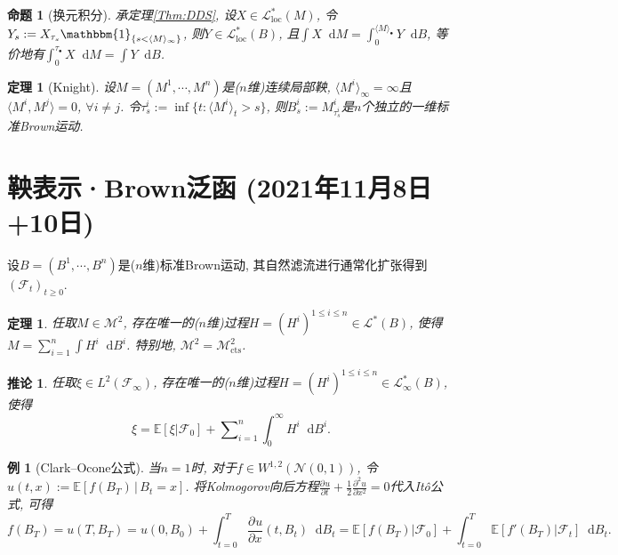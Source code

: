\documentclass{ctexart}
\theoremstyle{definition}
\theoremstyle{remark}
\theoremstyle{plain}
\newtheorem{Prop}[Def]{命题}
\newtheorem{Thm}[Def]{定理}
\newtheorem{Cor}[Def]{推论}
\newtheorem{Eg}[Def]{例}
\newtheorem{Ex}{习题}[section]
\newcommand{\N}{\mathcal{N}}				%
\newcommand{\1}{\mathbbm{1}}				%
\newcommand{\E}{\mathbb{E}}					%
\newcommand{\agp}[1]{\langle #1 \rangle}	%
\newcommand{\tsum}{\textstyle\sum\nolimits}
\renewcommand*{\d}{\mathop{}\!\mathrm{d}}	%
\newcommand{\pd}{\partial}					%
\newcommand{\p}[3][]{\frac{\pd^{#1}#2}{\pd{#3}^{#1}}}%
\begin{document}


\begin{Prop}[换元积分]
承定理\ref{Thm:DDS}, 设$X \in \mathcal{L}_{\mathrm{loc}}^{*}(M)$, 令$Y_{s} := X_{\tau_{s}}\1_{\{s<\agp{M}_{\infty}\}}$, 则$Y \in \mathcal{L}_{\mathrm{loc}}^{*}(B)$, 且$\int X \d M = \int_{0}^{\agp{M}_{\bullet}} Y \d B$, 等价地有$\int_{0}^{\tau_{\bullet}} X \d M = \int Y \d B$.
\end{Prop}

\begin{Thm}[Knight]
设$M = (M^{1},\cdots,M^{n})$是($n$维)连续局部鞅, $\agp{M^{i}}_{\infty} = \infty$且$\agp{M^{i},M^{j}} = 0$, $\forall i \neq j$. 令$\tau_{s}^{i} := \inf\{ t : \agp{M^{i}}_{t} > s \}$, 则$B^{i}_{s} := M^{i}_{\tau_{s}^{i}}$是$n$个独立的一维标准Brown运动.
\end{Thm}



\section{鞅表示·Brown泛函 \normalfont\footnotesize (2021年11月8日+10日)}
设$B = (B^{1},\cdots,B^{n})$是($n$维)标准Brown运动, 其自然滤流进行通常化扩张得到$(\mathscr{F}_{t})_{t \ge 0}$.

\begin{Thm}
任取$M \in \mathcal{M}^{2}$, 存在唯一的($n$维)过程$H = (H^{i})^{1\le i\le n} \in \mathcal{L}^{*}(B)$, 使得$M = \sum_{i=1}^{n} \int H^{i} \d B^{i}$. 特别地, $\mathcal{M}^{2} = \mathcal{M}^{2}_{\mathrm{cts}}$.
\end{Thm}

\begin{Cor}
任取$\xi \in L^{2}(\mathscr{F}_{\infty})$, 存在唯一的($n$维)过程$H = (H^{i})^{1\le i\le n} \in \mathcal{L}_{\infty}^{*}(B)$, 使得
\[ \xi = \E[\xi|\mathscr{F}_{0}] + \tsum_{i=1}^{n} \int_{0}^{\infty} H^{i} \d B^{i} . \]
\end{Cor}

\begin{Eg}[Clark--Ocone公式]
当$n = 1$时, 对于$f \in W^{1,2}(\N(0,1))$, 令$u(t,x) := \E[f(B_{T})\,|\,B_{t}=x]$. 将Kolmogorov向后方程$\p{u}{t} + \frac{1}{2}\p[2]{u}{x} = 0$代入It\^{o}公式, 可得\[ f(B_{T}) = u(T,B_{T}) = u(0,B_{0}) + \int_{t=0}^{T} \p{u}{x}(t,B_{t}) \d B_{t} = \E[f(B_{T})|\mathscr{F}_{0}] + \int_{t=0}^{T} \E[f'(B_{T})|\mathscr{F}_{t}] \d B_{t} . \]
\end{Eg}
\end{document}
